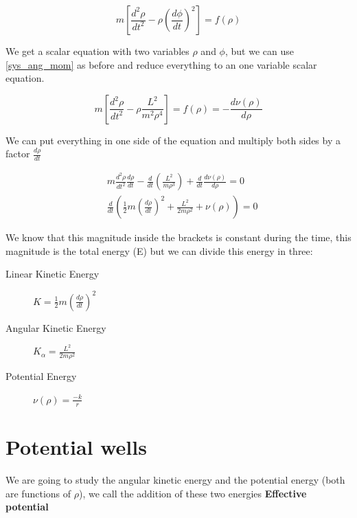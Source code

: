 \begin{equation}
    \label{scalar_eq}
    m\left[ \frac{d^2\rho}{dt^2}-\rho\left(\frac{d\phi}{dt}\right)^2 \right] = f(\rho)
\end{equation}

We get a scalar equation with two variables $\rho$ and $\phi$, but we can use \ref{sys_ang_mom} as before and reduce everything to an one variable scalar equation.

\begin{equation}
    \label{solution_1}
    m\left[ \frac{d^2\rho}{dt^2}-\rho\frac{L^2}{m^2\rho^4}\right] = f(\rho) = -\frac{d\nu(\rho)}{d\rho}
\end{equation}

We can put everything in one side of the equation and multiply both sides by a factor $\frac{d\rho}{dt}$

\begin{equation} \label{solution_2}
    \begin{split}
    & m \frac{d^2\rho}{dt^2} \frac{d\rho}{dt} - \frac{d}{dt} \left( \frac{L^2}{m\rho^3} \right) + \frac{d}{dt} \frac{d\nu(\rho)}{d\rho} = 0 \\
    & \frac{d}{dt} \left(\frac{1}{2}m\left(\frac{d\rho}{dt}\right)^2+\frac{L^2}{2m\rho^2}+ \nu(\rho) \right) = 0
    \end{split}
\end{equation}

We know that this magnitude inside the brackets is constant during the time, this magnitude is the total energy (E) but we can divide this energy in three:

\begin{description}
    \item [Linear Kinetic Energy] $K = \frac{1}{2}m(\frac{d\rho}{dt})^2$
    \item [Angular Kinetic Energy] $K_{\alpha} = \frac{L^2}{2m\rho^2}$
    \item [Potential Energy] $\nu(\rho) = \frac{-k}{r}$   
\end{description}
     
\section{Potential wells}

We are going to study the angular kinetic energy and the potential energy (both are functions of $\rho$), we call the addition of these two energies \textbf{Effective potential}

